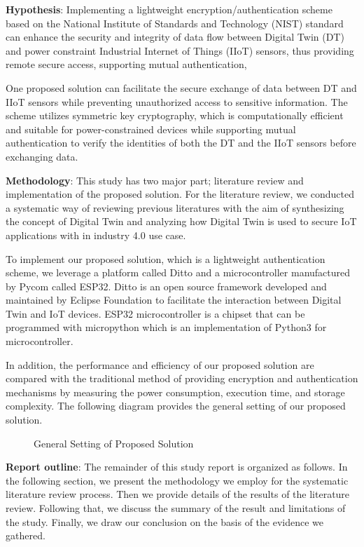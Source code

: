 \textbf{Hypothesis}:
Implementing a lightweight encryption/authentication scheme based on the National Institute of Standards and Technology (NIST) standard can enhance the security and integrity of data flow between Digital Twin (DT) and power constraint Industrial Internet of Things (IIoT) sensors, thus providing remote secure access, supporting mutual authentication,

One proposed solution  can facilitate the secure exchange of data between DT and IIoT sensors while preventing unauthorized access to sensitive information. The scheme utilizes symmetric key cryptography, which is computationally efficient and suitable for power-constrained devices while supporting mutual authentication to verify the identities of both the DT and the IIoT sensors before exchanging data.



\textbf{Methodology}:
This study has two major part; literature review and implementation of the proposed solution. For the literature review, we conducted a systematic way of reviewing previous literatures with the aim of synthesizing the concept of Digital Twin and analyzing how Digital Twin is used to secure IoT applications with in industry 4.0 use case. 

To implement our proposed solution, which is a lightweight authentication scheme, we leverage a platform called Ditto and a microcontroller manufactured by Pycom called ESP32. Ditto is an open source framework developed and maintained by Eclipse Foundation to facilitate the interaction between Digital Twin and IoT devices\cite{noauthor_eclipse_nodate}. ESP32 microcontroller is a chipset that can be programmed with micropython which is an implementation of Python3 for microcontroller. 

In addition, the performance and efficiency of our proposed solution are compared with the traditional  method of providing encryption and authentication mechanisms by measuring the power consumption, execution time, and storage complexity. The following diagram provides the general setting of our proposed solution.

\begin{figure}[H]
    \label{fig:ps-scheme}
    \caption{General Setting of Proposed Solution}
    \centering
    
    
\end{figure}

\textbf{Report outline}:
The remainder of this study report is organized as follows. In the following section, we present the methodology we employ for the systematic literature review process. Then we provide details of the results of the literature review. Following that, we discuss the summary of the result and limitations of the study. Finally, we draw our conclusion on the basis of the evidence we gathered.   

